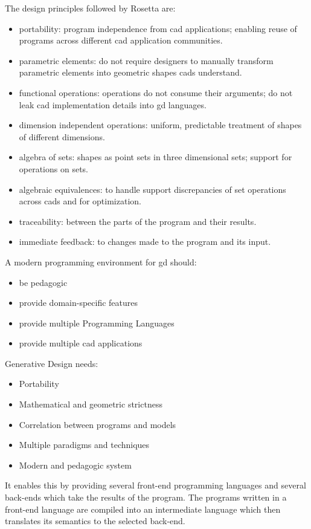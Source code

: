 \documentclass{./llncs2e/llncs}
\begin{document}
	The design principles followed by Rosetta are:
	\begin{itemize}
		\item portability: program independence from \ac{cad} applications; enabling reuse of programs across different \ac{cad} application communities.
		\item parametric elements: do not require designers to manually transform parametric elements into geometric shapes \ac{cad}s understand.
		\item functional operations: operations do not consume their arguments; do not leak \ac{cad} implementation details into \ac{gd} languages.
		\item dimension independent operations: uniform, predictable treatment of shapes of different dimensions.
		\item algebra of sets: shapes as point sets in three dimensional sets; support for operations on sets.
		\item algebraic equivalences: to handle support discrepancies of set operations across \ac{cad}s and for optimization.
		\item traceability: between the parts of the program and their results.
		\item immediate feedback: to changes made to the program and its input.
	\end{itemize}
	
	A modern programming environment for \ac{gd} should:
	\begin{itemize}
		\item be pedagogic
		\item provide domain-specific features
		\item provide multiple Programming Languages
		\item provide multiple \ac{cad} applications
	\end{itemize}
	
	Generative Design needs:
	\begin{itemize}
		\item Portability
		\item Mathematical and geometric strictness
		\item Correlation between programs and models
		\item Multiple paradigms and techniques
		\item Modern and pedagogic system
	\end{itemize}
	
	It enables this by providing several front-end programming languages and several back-ends which take the results of the program. 
	The programs written in a front-end language are compiled into an intermediate language which then translates its semantics to the selected back-end\cite{lopes2011portable}.
	
\end{document}
